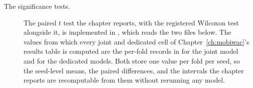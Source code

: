 \begin{description}
  \item[The significance tests.] The paired $t$ test the chapter reports, with the registered
        Wilcoxon test alongside it, is implemented in
        , which reads the two files
        below. The values from which every joint and dedicated cell of
        Chapter~\ref{ch:mobiwac}'s results table is computed are the per-fold records in
         for the joint model
        and  for the dedicated
        models. Both store one value per fold per seed, so the seed-level means, the paired
        differences, and the intervals the chapter reports are recomputable from them
        without rerunning any model.
\end{description}

